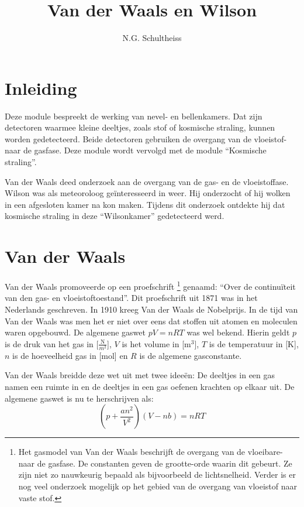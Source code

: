 



\title{Van der Waals en Wilson}
\author{N.G. Schultheiss}
\date{}

\maketitle
\thispagestyle{firststyle}

\section{Inleiding}

Deze module bespreekt de werking van nevel- en bellenkamers. Dat zijn
detectoren waarmee kleine deeltjes, zoals stof of kosmische straling,
kunnen worden gedetecteerd. Beide detectoren gebruiken de overgang
van de vloeistof- naar de gasfase. Deze module wordt vervolgd met
de module ``Kosmische straling''.

Van der Waals deed onderzoek aan de overgang van de gas- en de vloeistoffase.
Wilson was als meteoroloog geïnteresseerd in weer. Hij onderzocht
of hij wolken in een afgesloten kamer na kon maken. Tijdens dit onderzoek
ontdekte hij dat kosmische straling in deze ``Wilsonkamer'' gedetecteerd
werd.


\section{Van der Waals}

Van der Waals promoveerde op een proefschrift \footnote{Het gasmodel van
Van der Waals beschrijft de overgang van de vloeibare- naar de gasfase.
De constanten geven de grootte-orde waarin dit gebeurt. Ze zijn niet zo
nauwkeurig bepaald als bijvoorbeeld de lichtsnelheid. Verder is er nog
veel onderzoek mogelijk op het gebied van de overgang van vloeistof naar
vaste stof.} genaamd: ``Over de continuïteit van den gas- en
vloeistoftoestand''. Dit proefschrift uit 1871 was in het Nederlands
geschreven. In 1910 kreeg Van der Waals de Nobelprijs. In de tijd van
Van der Waals was men het er niet over eens dat stoffen uit atomen en
moleculen waren opgebouwd. De algemene gaswet $pV=nRT$ was wel bekend.
Hierin geldt $p$ is de druk van het gas in
{[}$\frac{\mathrm{N}}{m^{2}}${]}, $V$ is het volume in
{[}$\mathrm{m}^{3}${]}, $T$ is de temperatuur in {[}K{]}, $n$ is de
hoeveelheid gas in {[}mol{]} en $R$ is de algemene gasconstante. 

Van der Waals breidde deze wet uit met twee ideeën: De deeltjes in
een gas namen een ruimte in en de deeltjes in een gas oefenen krachten
op elkaar uit. De algemene gaswet is nu te herschrijven als: 
\begin{equation}
\left(p+\frac{an^{2}}{V^{2}}\right)\left(V-nb\right)=nRT
\end{equation}


